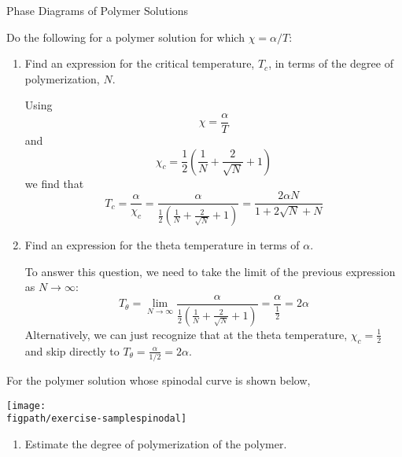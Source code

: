 \begin{activity}{Phase Diagrams of Polymer Solutions}
\begin{exercises}
\begin{enumerate}
				
		\end{enumerate}
		
	\exercise Do the following for a polymer solution for which $\chi = \alpha/T$:
		
		\begin{enumerate}
			\item Find an expression for the critical temperature, $T_c$, in terms of the degree of polymerization, $N$.
			
				\begin{solution}{}
					Using
					\begin{equation*}
						\chi = \frac{\alpha}{T}
					\end{equation*}
					and
					\begin{equation*}
						\chi_c = \frac{1}{2}\left(\frac{1}{N} + \frac{2}{\sqrt{N}} + 1\right)
					\end{equation*}
					we find that
					\begin{equation*}
						T_c = \frac{\alpha}{\chi_c} = \frac{\alpha}{\frac{1}{2}\left(\frac{1}{N} + \frac{2}{\sqrt{N}} + 1\right)} = \frac{2\alpha N}{1 + 2\sqrt{N} + N}
					\end{equation*}
				\end{solution}
				
			\item Find an expression for the theta temperature  in terms of $\alpha$.
			
				\begin{solution}{}
					To answer this question, we need to take the limit of the previous expression as $N\to\infty$:
					\begin{equation*}
						T_\theta = \lim_{N\to\infty} \frac{\alpha}{\frac{1}{2}\left(\frac{1}{N} + \frac{2}{\sqrt{N}} + 1\right)} = \frac{\alpha}{\frac{1}{2}} = 2\alpha
					\end{equation*}
					Alternatively, we can just recognize that at the theta temperature, $\chi_c = \frac{1}{2}$ and skip directly to $T_\theta = \frac{\alpha}{1/2} = 2\alpha$.
				\end{solution}
				
		\end{enumerate}
		
	\exercise For the polymer solution whose spinodal curve is shown below,
	
		\centerline{\texttt{[image: \\figpath/exercise-samplespinodal]}}
	
		\begin{enumerate}
			\item Estimate the degree of polymerization of the polymer.
				

\end{enumerate}
\end{exercises}
\end{activity}

